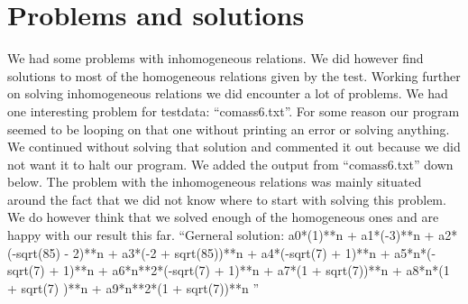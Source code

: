 \documentclass{article}
\begin{document}
\section{Problems and solutions}
We had some problems with inhomogeneous relations. We did however find solutions to most of the homogeneous relations given by the test. Working further on solving inhomogeneous relations we did encounter a lot of problems.
\newline
\newline
We had one interesting problem for testdata: ``comass6.txt''. For some reason our program seemed to be looping on that one without printing an error or solving anything. We continued without solving that solution and commented it out because we did not want it to halt our program. We added the output from ``comass6.txt'' down below.
\newline
\newline
The problem with the inhomogeneous relations was mainly situated around the fact that we did not know where to start with solving this problem.
We do however think that we solved enough of the homogeneous ones and are happy with our result this far.
\newline
\newline
``Gerneral solution: a0*(1)**n + a1*(-3)**n + a2*(-sqrt(85) - 2)**n + a3*(-2 + sqrt(85))**n + a4*(-sqrt(7) + 1)**n + a5*n*(-sqrt(7) + 1)**n + a6*n**2*(-sqrt(7) + 1)**n + a7*(1 + sqrt(7))**n + a8*n*(1 + sqrt(7)
)**n + a9*n**2*(1 + sqrt(7))**n
''
\end{document}

